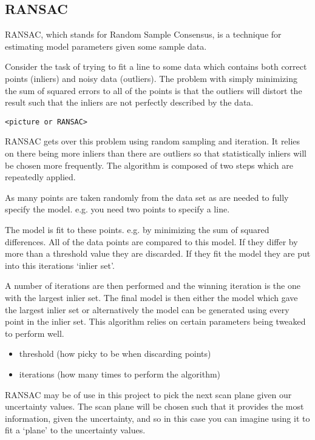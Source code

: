 \documentclass[
  oneside,
  11pt, a4paper,
  footinclude=true,
  headinclude=true,
  cleardoublepage=empty
]{scrbook}
\begin{document}
\newpage
\subsection{RANSAC}
RANSAC, which stands for Random Sample Consensus, is a technique for estimating model parameters given some sample data.

Consider the task of trying to fit a line to some data which contains both correct points (inliers) and noisy data (outliers). The problem with simply minimizing the sum of squared errors to all of the points is that the outliers will distort the result such that the inliers are not perfectly described by the data.

\begin{verbatim}
<picture or RANSAC>
\end{verbatim}

RANSAC gets over this problem using random sampling and iteration. It relies on there being more inliers than there are outliers so that statistically inliers will be chosen more frequently. The algorithm is composed of two steps which are repeatedly applied.

As many points are taken randomly from the data set as are needed to fully specify the model. e.g. you need two points to specify a line.

The model is fit to these points. e.g. by minimizing the sum of squared differences.
All of the data points are compared to this model. If they differ by more than a threshold value they are discarded. If they fit the model they are put into this iterations ‘inlier set’.

A number of iterations are then performed and the winning iteration is the one with the largest inlier set. The final model is then either the model which gave the largest inlier set or alternatively the model can be generated using every point in the inlier set.
This algorithm relies on certain parameters being tweaked to perform well.

\begin{itemize}
	\item threshold (how picky to be when discarding points)
	\item iterations (how many times to perform the algorithm)
\end{itemize}

RANSAC may be of use in this project to pick the next scan plane given our uncertainty values. The scan plane will be chosen such that it provides the most information, given the uncertainty, and so in this case you can imagine using it to fit a ‘plane’ to the uncertainty values.
\end{document}
